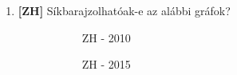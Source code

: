\documentclass[a4paper, 12pt]{article}
\begin{document}
\begin{enumerate}
            \hrule
            \item \textbf{[ZH]} Síkbarajzolhatóak-e az alábbi gráfok?
            \begin{figure}[!ht]
                \centering
                \begin{subfigure}{0.2\textwidth}
                    \centering				
                    
                    \caption{ZH - 2010}
                \end{subfigure}
                \begin{subfigure}{0.2\textwidth}
                    \centering					
                    
                    \caption{ZH - 2015}
                \end{subfigure}
                \begin{subfigure}{0.25\textwidth}
                    \centering					
                    

\end{subfigure}
\end{figure}
\end{enumerate}
\end{document}
